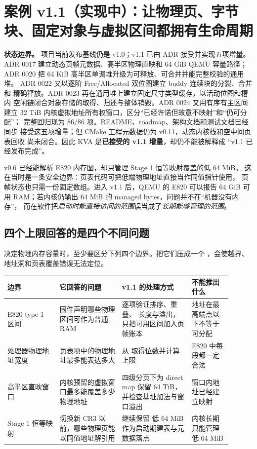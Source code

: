\section{案例 v1.1（实现中）：让物理页、字节块、固定对象与虚拟区间都拥有生命周期}
\label{case:v11-physical-memory}

\begin{statebox}
\textbf{状态边界。} 项目当前发布基线仍是 v1.0；v1.1 已由 ADR 接受并实现五项增量。
ADR 0017 建立动态页帧元数据、高半区物理直映和 64 GiB QEMU 容量路径；
ADR 0020 把 64 KiB 高半区单调堆升级为可释放、可合并并能完整校验的通用堆。
ADR 0022 又以逐阶 Free/Allocated 双位图建立 buddy 连续块的分裂、合并和
精确释放。ADR 0023 再在通用堆上建立固定尺寸类型缓存，以活动位图和槽内
空闲链闭合对象存储的取得、归还与整体销毁。ADR 0024 又用有序有主区间建立
32 TiB 内核虚拟地址所有权窗口，区分“已经许诺但故意不映射”和“仍可分配”；
完整回归现为 \(86/86\) 项。README、roadmap、架构文档和测试文档已经同步
接受这五项增量；但 CMake 工程元数据仍为 v0.11，动态内核栈和空中间页表回收
尚未闭合。因此 KVA 是\textbf{已接受的 v1.1 增量}，却仍不能被解释成
“v1.1 已经发布完成”。
\end{statebox}

v0.6 已经能解析 E820 内存图，却只管理 Stage 1 恒等映射覆盖的低 64 MiB。
这在当时是一条安全边界：页表代码可把低端物理地址直接当作同值指针使用，
页帧状态也只需一份固定数组。进入 v1.1 后，QEMU 的 E820 可以报告 64 GiB
可用 RAM；若内核仍输出 64 MiB 的 managed bytes，问题并不在“机器没有内存”，
而在软件把\emph{启动时能直接访问的范围}误当成了\emph{长期能够管理的范围}。

\subsection{四个上限回答的是四个不同问题}

决定物理内存容量时，至少要区分下列四个边界。把它们压成一个
，会使越界、地址洞和页表覆盖错误无法定位。

\begin{longtable}{|L{0.21\linewidth}|L{0.25\linewidth}|L{0.28\linewidth}|L{0.16\linewidth}|}
\toprule
边界 & 它回答的问题 & v1.1 的处理方式 & 不能推出什么 \\
\midrule
\endhead
E820 type 1 区间 & 固件声明哪些物理区间可作为普通 RAM & 逐项验证排序、重叠、
长度与溢出，只把可用区间加入页帧账本 & 地址在最高端点以下不等于可分配
\\\tablerowrule
处理器物理地址宽度 & 页表项中的物理地址最多能表达多大 & 从
 取得位数并计算上限 & E820 中每段都一定合法
\\\tablerowrule
高半区直映窗口 & 内核预留的虚拟窗口最多能覆盖多少物理地址 & 四级分页下为
direct map 保留 64 TiB，并检查基址加法与窗口溢出 & 窗口内地址已经建立映射
\\\tablerowrule
Stage 1 恒等映射 & 切换新 CR3 以前，哪些物理页能以同值地址解引用 & 继续保留
低 64 MiB 作为启动期建表与元数据落点 & 内核长期只能管理低 64 MiB \\
\bottomrule
\end{longtable}

